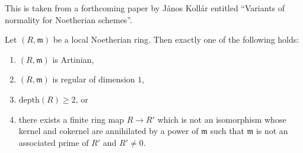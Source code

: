 \begin{lemma}[Koll\'ar]
\label{lemma-hart-serre-loc-thm}
\begin{reference}
This is taken from a forthcoming paper by
J\'anos Koll\'ar entitled ``Variants of normality for Noetherian schemes''.
\end{reference}
Let $(R, \mathfrak m)$ be a local Noetherian ring.
Then exactly one of the following holds:
\begin{enumerate}
\item $(R, \mathfrak m)$ is Artinian,
\item $(R, \mathfrak m)$ is regular of dimension $1$,
\item $\text{depth}(R) \geq 2$, or
\item there exists a finite ring map $R \to R'$ which is not
an isomorphism whose kernel and cokernel are annihilated by a power
of $\mathfrak m$ such that $\mathfrak m$ is not an associated
prime of $R'$ and $R' \not = 0$.
\end{enumerate}
\end{lemma}

